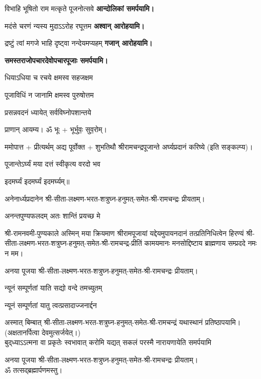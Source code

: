 \begin{center}
{विभाहि भूषितो राम मत्कृते पूजनोत्सवे}
\textbf{\hfill आन्दोलिकां समर्पयामि।}


{मदंसे चरणं न्यस्य मुदाऽऽरोह रघूत्तम}
\textbf{\hfill अश्वान् आरोहयामि।}


{द्रष्टुं त्वां मगजे भाहि दृष्ट्वा नन्देयमप्यहम्}
\textbf{\hfill गजान् आरोहयामि।}

\textbf{समस्तराजोपचारदेवोपचारपूजाः समर्पयामि।}


{धियाऽधिया च रचये क्षमस्व सहजक्षम}

{पूजाविधिं न जानामि क्षमस्व पुरुषोत्तम}



{प्रसन्नवदनं ध्यायेत् सर्वविघ्नोपशान्तये}


प्राणान्  आयम्य।  ॐ भूः + भूर्भुवः॒ सुव॒रोम्।

ममोपात्त + प्रीत्यर्थम् अद्य पूर्वोक्त + शुभतिथौ श्रीरामचन्द्रपूजान्ते अर्घ्यप्रदानं करिष्ये (इति सङ्कल्प्य)।

{पूजान्तेऽर्घ्यं मया दत्तं स्वीकृत्य वरदो भव}

\devAya{} इदमर्घ्यं इदमर्घ्यं इदमर्घ्यम्॥

अनेनार्ध्यप्रदानेन श्री-सीता-लक्ष्मण-भरत-शत्रुघ्न-हनुमत्-समेत-श्री-रामचन्द्रः प्रीयताम्।

{अनन्तपुण्यफलदम् अतः शान्तिं प्रयच्छ मे}

श्री-रामनवमी-पुण्यकाले अस्मिन् मया क्रियमाण श्रीरामपूजायां यद्देयमुपायनदानं तत्प्रतिनिधित्वेन हिरण्यं श्री-सीता-लक्ष्मण-भरत-शत्रुघ्न-हनुमत्-समेत-श्री-रामचन्द्र-प्रीतिं 
कामयमानः मनसोद्दिष्टाय ब्राह्मणाय सम्प्रददे नमः न मम। 

अनया पूजया श्री-सीता-लक्ष्मण-भरत-शत्रुघ्न-हनुमत्-समेत-श्री-रामचन्द्रः प्रीयताम्। 
 
{न्यूनं सम्पूर्णतां याति सद्यो वन्दे तमच्युतम्} 

{न्यूनं सम्पूर्णतां यातु त्वत्प्रसादाज्जनार्द्दन}

अस्मात् बिम्बात् श्री-सीता-लक्ष्मण-भरत-शत्रुघ्न-हनुमत्-समेत-श्री-रामचन्द्रं यथास्थानं प्रतिष्ठापयामि।\\
(अक्षतानर्पित्वा देवमुत्सर्जयेत्।)\\

{बुद्‌ध्याऽऽत्मना वा प्रकृतेः स्वभावात्}
{करोमि यद्यत् सकलं परस्मै}
{नारायणायेति समर्पयामि}

अनया पूजया श्री-सीता-लक्ष्मण-भरत-शत्रुघ्न-हनुमत्-समेत-श्री-रामचन्द्रः प्रीयताम्। \\
ॐ तत्सद्ब्रह्मार्पणमस्तु।

\end{center}

\closesub


\closesection